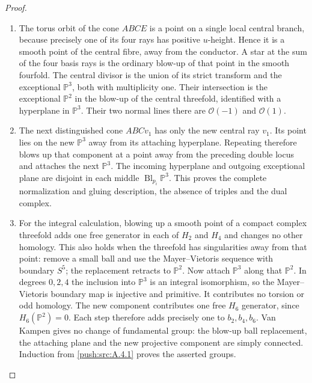 \begin{proof}
\begin{enumerate}[label=\arabic*.,leftmargin=*]
\item The torus orbit of the cone $ABCE$ is a point on a single
local central branch, because precisely one of its four
rays has positive $u$-height. Hence it is a smooth point
of the central fibre, away from the conductor. A star at
the sum of the four basis rays is the ordinary blow-up
of that point in the smooth fourfold. The central divisor
is the union of its strict transform and the exceptional
$\mathbb P^3$, both with multiplicity one. Their
intersection is the exceptional $\mathbb P^2$ in the
blow-up of the central threefold, identified with a
hyperplane in $\mathbb P^3$. Their two normal lines there
are $\mathcal O(-1)$ and $\mathcal O(1)$.

\item The next distinguished cone $ABCv_1$ has only the new
central ray $v_1$. Its point lies on the new $\mathbb P^3$
away from its attaching hyperplane. Repeating therefore
blows up that component at a point away from the preceding
double locus and attaches the next $\mathbb P^3$. The
incoming hyperplane and outgoing exceptional plane are
disjoint in each middle $\operatorname{Bl}_{p_i}\mathbb P^3$.
This proves the complete normalization and gluing
description, the absence of triples and the dual complex.

\item For the integral calculation, blowing up a smooth point
of a compact complex threefold adds one free generator
in each of $H_2$ and $H_4$ and changes no other homology.
This also holds when the threefold has singularities away
from that point: remove a small ball and use the
Mayer--Vietoris sequence with boundary $S^5$; the
replacement retracts to $\mathbb P^2$. Now attach
$\mathbb P^3$ along that $\mathbb P^2$. In degrees
$0,2,4$ the inclusion into $\mathbb P^3$ is an integral
isomorphism, so the Mayer--Vietoris boundary map is
injective and primitive. It contributes no torsion or
odd homology. The new component contributes one free
$H_6$ generator, since $H_6(\mathbb P^2)=0$. Each step
therefore adds precisely one to $b_2,b_4,b_6$.
Van Kampen gives no change of fundamental group: the
blow-up ball replacement, the attaching plane and the
new projective component are simply connected.
Induction from \ref{push:src:A.4.1} proves the asserted groups.


\end{enumerate}
\end{proof}

